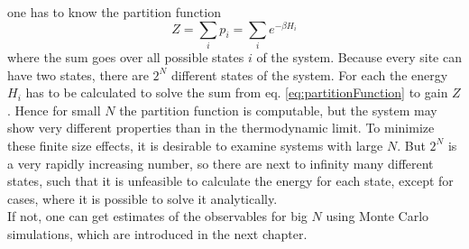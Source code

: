     one has to know the partition function
    \begin{equation}
        Z = \sum_i p_i = \sum_i e^{-\beta H_i}
        \label{eq:partitionFunction}
    \end{equation}
    where the sum goes over all possible states \(i\) of the system.
    Because every site can have two states, there are \(2^N\) different
    states of the system. For each the energy \(H_i\) has to be calculated
    to solve the sum from eq. \eqref{eq:partitionFunction} to gain \(Z\).
    Hence for small \(N\) the partition function is computable, but the system
    may show very different properties than in the thermodynamic limit.
    To minimize these finite size effects, it is desirable to examine
    systems with large \(N\). But \(2^N\) is a very rapidly increasing
    number, so there are next to infinity many different states, such
    that it is unfeasible to calculate the energy for each state, except
    for cases, where it is possible to solve it analytically.\\
    If not, one can get estimates of the observables for big \(N\) using
    Monte Carlo simulations, which are introduced in the next chapter.\\

